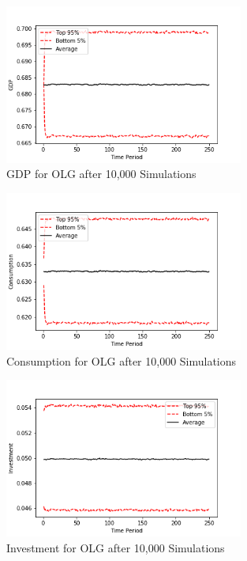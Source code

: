 \documentclass[letterpaper,11pt]{article}
\theoremstyle{definition}
\begin{document}
\begin{spacing}{1.5}
	\begin{figure}[H]
		\caption{GDP for OLG after 10,000 Simulations}
		\label{fig:GDP_OLG}
		\includegraphics[width=0.7\textwidth]{GDP_OLG.png}
	\end{figure}

	\begin{figure}[H]
		\caption{Consumption for OLG after 10,000 Simulations}
		\label{fig:Consumption_OLG}
		\includegraphics[width=0.7\textwidth]{Consumption_OLG.png}
	\end{figure}

	\begin{figure}[H]
		\caption{Investment for OLG after 10,000 Simulations}
		\label{fig:Investment_OLG}
		\includegraphics[width=0.7\textwidth]{Investment_OLG.png}
	\end{figure}


\end{spacing}
\end{document}
